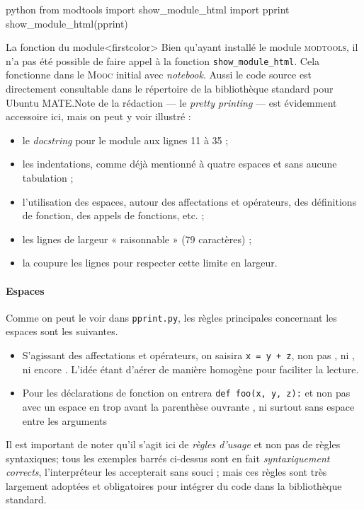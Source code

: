 \begin{codebox}{python}
from modtools import show_module_html
import pprint
show_module_html(pprint)
\end{codebox}

La fonction du module\caution[t]<firstcolor>{%
Bien qu'ayant installé le module \textsc{modtools}, il n'a pas été possible de faire appel à la fonction \texttt{show\_module\_html}. Cela fonctionne dans le \textsc{Mooc} initial avec \textit{notebook}. Aussi le code source est directement consultable dans le répertoire de la bibliothèque standard  pour Ubuntu MATE.}{Note de la rédaction}
 --- le \textit{pretty printing} --- est évidemment accessoire ici, mais on peut y voir illustré :
\begin{itemize}
\item le \textit{docstring} pour le module aux lignes 11 à 35 ;
\item les indentations, comme déjà mentionné à quatre espaces et sans aucune tabulation ;
\item l'utilisation des espaces, autour des affectations et opérateurs, des définitions de fonction, des appels de fonctions, etc. ;
\item les lignes de largeur « raisonnable » (79 caractères) ;
\item la coupure les lignes pour respecter cette limite en largeur.
\end{itemize}

\paragraph*{Espaces}
Comme on peut le voir dans \texttt{pprint.py}, les règles principales concernant les espaces sont les suivantes.
\begin{itemize}\jazzitem
\item S'agissant des affectations et opérateurs, on saisira \texttt{x = y + z}, non pas , ni , ni encore . L'idée étant d'aérer de manière homogène pour faciliter la lecture.
\item  Pour les déclarations de fonction on entrera \texttt{def foo(x, y, z):} et non pas avec un espace en trop avant la parenthèse ouvrante , ni surtout sans espace entre les arguments 
\end{itemize}

Il est important de noter qu'il s'agit ici de \emph{règles d'usage} et non pas de règles syntaxiques; tous les exemples barrés ci-dessus sont en fait \emph{syntaxiquement corrects}, l'interpréteur les accepterait sans souci ; mais ces règles sont très largement adoptées et obligatoires pour intégrer du code dans la bibliothèque standard.

